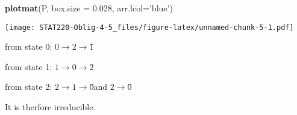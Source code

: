 \documentclass[]{article}
\newenvironment{Shaded}{\begin{snugshade}}{\end{snugshade}}
\newcommand{\DataTypeTok}[1]{\textcolor[rgb]{0.13,0.29,0.53}{#1}}
\newcommand{\FloatTok}[1]{\textcolor[rgb]{0.00,0.00,0.81}{#1}}
\newcommand{\KeywordTok}[1]{\textcolor[rgb]{0.13,0.29,0.53}{\textbf{#1}}}
\newcommand{\NormalTok}[1]{#1}
\newcommand{\StringTok}[1]{\textcolor[rgb]{0.31,0.60,0.02}{#1}}
\begin{document}
\begin{Shaded}
\begin{Highlighting}[]
\KeywordTok{plotmat}\NormalTok{(P, }\DataTypeTok{box.size =} \FloatTok{0.028}\NormalTok{, }\DataTypeTok{arr.lcol=}\StringTok{'blue'}\NormalTok{)}
\end{Highlighting}
\end{Shaded}

\texttt{[image: STAT220-Oblig-4-5\_files/figure-latex/unnamed-chunk-5-1.pdf]}

from state 0: \(0 \rightarrow{2} \rightarrow{1}̋\)

from state 1: \(1 \rightarrow{0} \rightarrow{2}\)

from state 2: \(2 \rightarrow{1} \rightarrow{0}\)̋and
\(2 \rightarrow{0}̋\)

It is therfore irreducible.
\end{document}
